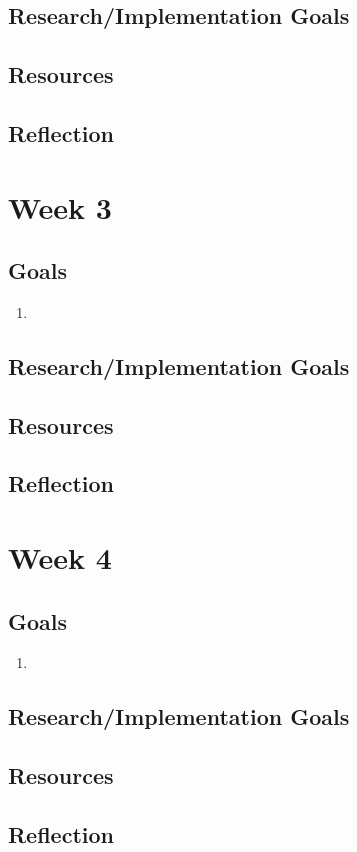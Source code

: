 \documentclass[conference]{IEEEtran}
\begin{document}
\subsection{Research/Implementation Goals}

\subsection{Resources}

\subsection{Reflection}


\section*{Week 3}

\subsection{Goals}
\begin{enumerate}
\item 
\end{enumerate}

\subsection{Research/Implementation Goals}

\subsection{Resources}

\subsection{Reflection}


\section*{Week 4}

\subsection{Goals}
\begin{enumerate}
\item 
\end{enumerate}

\subsection{Research/Implementation Goals}

\subsection{Resources}

\subsection{Reflection}




\end{document}
